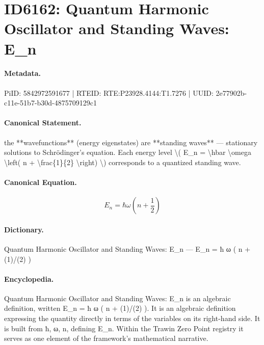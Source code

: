 \section*{ID6162: Quantum Harmonic Oscillator and Standing Waves: E\_n}
\paragraph{Metadata.}
PiID: 5842972591677 | RTEID: RTE:P23928.4144:T1.7276 | UUID: 2e77902b-c11e-51b7-b30d-4875709129c1

\paragraph{Canonical Statement.}
the **wavefunctions** (energy eigenstates) are **standing waves** — stationary solutions to Schrödinger’s equation. Each energy level \textbackslash{}( E\_n = \textbackslash{}hbar \textbackslash{}omega \textbackslash{}left( n + \textbackslash{}frac\{1\}\{2\} \textbackslash{}right) \textbackslash{}) corresponds to a quantized standing wave.

\paragraph{Canonical Equation.}
\[
E_n = \hbar \omega \left( n + \frac{1}{2} \right)
\]

\paragraph{Dictionary.}
Quantum Harmonic Oscillator and Standing Waves: E\_n — E\_n = ħ ω ( n + (1)/(2) )

\paragraph{Encyclopedia.}
Quantum Harmonic Oscillator and Standing Waves: E\_n is an algebraic definition, written E\_n = ħ ω ( n + (1)/(2) ). It is an algebraic definition expressing the quantity directly in terms of the variables on its right-hand side. It is built from ħ, ω, n, defining E\_n. Within the Trawin Zero Point registry it serves as one element of the framework's mathematical narrative.
